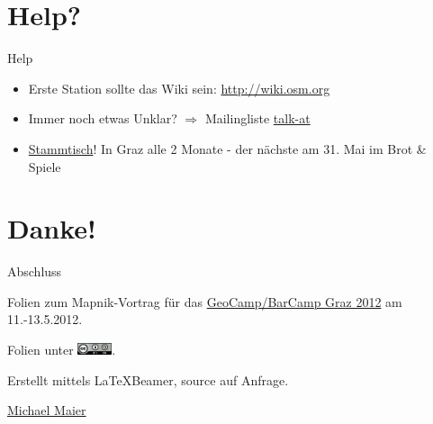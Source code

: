 \documentclass{beamer}
\begin{document}
\section{Help?}

\begin{frame}{Help}

\begin{itemize}
  \item Erste Station sollte das Wiki sein: \url{http://wiki.osm.org}
  \item Immer noch etwas Unklar? $\Rightarrow$ Mailingliste \href{http://lists.openstreetmap.org/listinfo/talk-at}{talk-at}
  \pause
  \item \href{http://wiki.openstreetmap.org/wiki/Graz/Stammtisch}{Stammtisch}! In Graz alle 2 Monate - der nächste am 31. Mai im Brot \& Spiele
\end{itemize}

\end{frame}

\section{Danke!}

\begin{frame}{Abschluss}

Folien zum Mapnik-Vortrag für das \href{http://www.barcamp.at/BarCamp\_Graz\_2012}{GeoCamp/BarCamp Graz 2012} am 11.-13.5.2012.
\vspace{1cm}

Folien unter \includegraphics[width=1cm]{cc-by-sa.png}.
\vspace{1cm}

Erstellt mittels \LaTeX Beamer, source auf Anfrage.
\vspace{1cm}

\href{mailto:michael.maier@student.tugraz.at}{Michael Maier}
\end{frame}
\end{document}
